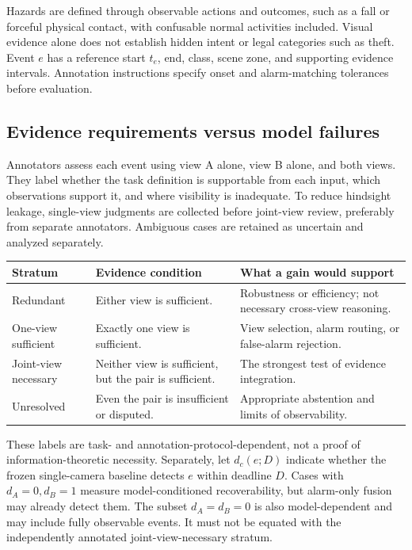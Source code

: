 \documentclass[10pt,a4paper]{article}
\begin{document}
Hazards are defined through observable actions and outcomes, such as a fall or forceful physical contact, with confusable normal activities included. Visual evidence alone does not establish hidden intent or legal categories such as theft. Event $e$ has a reference start $t_e$, end, class, scene zone, and supporting evidence intervals. Annotation instructions specify onset and alarm-matching tolerances before evaluation.

\subsection{Evidence requirements versus model failures}
Annotators assess each event using view A alone, view B alone, and both views. They label whether the task definition is supportable from each input, which observations support it, and where visibility is inadequate. To reduce hindsight leakage, single-view judgments are collected before joint-view review, preferably from separate annotators. Ambiguous cases are retained as uncertain and analyzed separately.

\begin{center}
\small
\begin{tabularx}{\linewidth}[t]{@{}>{\raggedright\arraybackslash}p{28mm}YY@{}}
\toprule
Stratum & Evidence condition & What a gain would support \\
\midrule
Redundant & Either view is sufficient. & Robustness or efficiency; not necessary cross-view reasoning. \\
One-view sufficient & Exactly one view is sufficient. & View selection, alarm routing, or false-alarm rejection. \\
Joint-view necessary & Neither view is sufficient, but the pair is sufficient. & The strongest test of evidence integration. \\
Unresolved & Even the pair is insufficient or disputed. & Appropriate abstention and limits of observability. \\
\bottomrule
\end{tabularx}
\end{center}

These labels are task- and annotation-protocol-dependent, not a proof of information-theoretic necessity. Separately, let $d_c(e;D)$ indicate whether the frozen single-camera baseline detects $e$ within deadline $D$. Cases with $d_A=0,d_B=1$ measure model-conditioned recoverability, but alarm-only fusion may already detect them. The subset $d_A=d_B=0$ is also model-dependent and may include fully observable events. It must not be equated with the independently annotated joint-view-necessary stratum.
\end{document}
